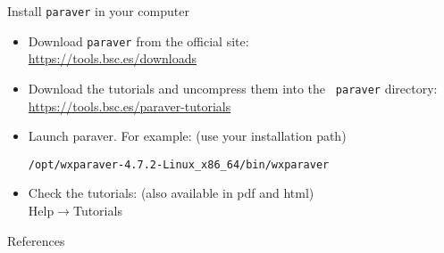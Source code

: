 \documentclass[10pt,xcolor=table]{beamer}
\begin{document}
\begin{frame}[fragile]{Install {\tt paraver} in your computer}
  \begin{itemize}
  \item Download {\tt paraver} from the official site:\\
    \hfil \url{https://tools.bsc.es/downloads}
  \item Download the tutorials and uncompress them into the {\tt
      paraver} directory:\\
    \hfil \url{https://tools.bsc.es/paraver-tutorials}
  \item Launch paraver. For example: (use your installation path)
    \begin{lstlisting}[style=shell,gobble=3]
      /opt/wxparaver-4.7.2-Linux_x86_64/bin/wxparaver
    \end{lstlisting}
  \item Check the tutorials: {\small (also available in pdf and html)}\\
    \hfil Help$\rightarrow$Tutorials
  \end{itemize}
\end{frame}



\appendix

\begin{frame}[allowframebreaks]{References}

  \nocite{*}
  
  

\end{frame}
\end{document}
